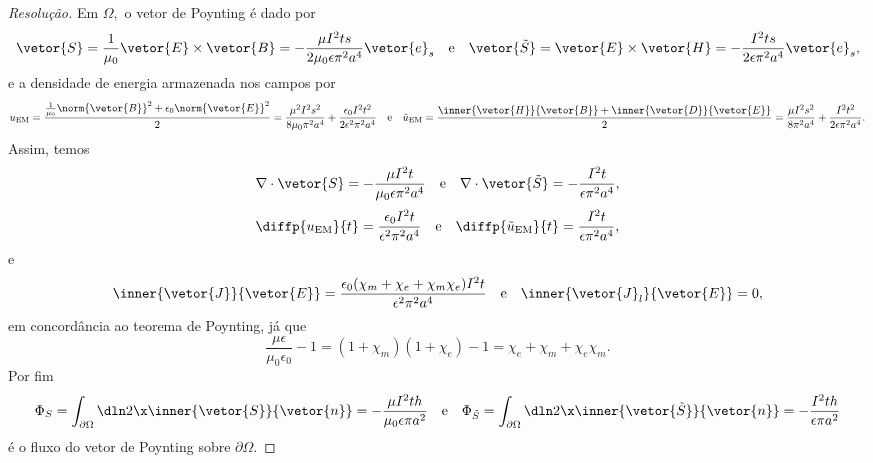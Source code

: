 \begin{proof}[Resolução]
    Em \(\Omega,\) o vetor de Poynting é dado por
    \begin{equation*}
        \vetor{S} = \frac1{\mu_0}\vetor{E}\times \vetor{B} = -\frac{\mu I^2t s}{2\mu_0 \epsilon \pi^2 a^4 }\vetor{e}_s
        \quad\text{e}\quad
        \vetor{\tilde{S}} = \vetor{E}\times \vetor{H} = -\frac{I^2t s}{2\epsilon \pi^2 a^4 }\vetor{e}_s,
    \end{equation*}
    e a densidade de energia armazenada nos campos por
    \begin{equation*}
    u_\mathrm{EM} = \frac{\frac1{\mu_0} \norm{\vetor{B}}^2 + \epsilon_0 \norm{\vetor{E}}^2}{2} = \frac{\mu^2  I^2 s^2}{8 \mu_0  \pi^2 a^4} + \frac{\epsilon_0 I^2 t^2}{2\epsilon^2 \pi^2 a^4}
        \quad\text{e}\quad
        \tilde{u}_\mathrm{EM} = \frac{\inner{\vetor{H}}{\vetor{B}} + \inner{\vetor{D}}{\vetor{E}} }{2} = \frac{\mu  I^2 s^2}{8  \pi^2 a^4}+\frac{I^2 t^2}{2 \epsilon\pi^2a^4}.
    \end{equation*}
    Assim, temos
    \begin{equation*}
        \nabla\cdot \vetor{S} = -\frac{\mu I^2 t}{\mu_0 \epsilon \pi^2 a^4}\quad\text{e}\quad
        \nabla\cdot \vetor{\tilde{S}} = -\frac{I^2 t}{\epsilon \pi^2 a^4},
    \end{equation*}
    \begin{equation*}
        \diffp{u_\mathrm{EM}}{t} = \frac{\epsilon_0I^2 t}{\epsilon^2 \pi^2 a^4}
        \quad\text{e}\quad
        \diffp{\tilde{u}_\mathrm{EM}}{t} = \frac{I^2 t}{\epsilon \pi^2 a^4},
    \end{equation*}
    e
    \begin{equation*}
        \inner{\vetor{J}}{\vetor{E}} = \frac{\epsilon_0(\chi_m + \chi_e + \chi_m \chi_e)I^2t}{\epsilon^2 \pi^2 a^4}
        \quad\text{e}\quad
        \inner{\vetor{J}_l}{\vetor{E}} = 0,
    \end{equation*}
    em concordância ao teorema de Poynting, já que
    \begin{equation*}
        \frac{\mu \epsilon}{\mu_0 \epsilon_0} - 1 = (1 + \chi_m)(1 + \chi_e) - 1 = \chi_e + \chi_m + \chi_e\chi_m.
    \end{equation*}
    Por fim
    \begin{equation*}
        \Phi_S = \int_{\partial\Omega} \dln2\x \inner{\vetor{S}}{\vetor{n}} = -\frac{\mu I^2 t h}{\mu_0 \epsilon \pi a^2}\quad\text{e}\quad
        \Phi_{\tilde{S}} = \int_{\partial \Omega} \dln2\x \inner{\vetor{\tilde{S}}}{\vetor{n}} = - \frac{I^2 t h}{\epsilon \pi a^2}
    \end{equation*}
    é o fluxo do vetor de Poynting sobre \(\partial \Omega\).
\end{proof}
